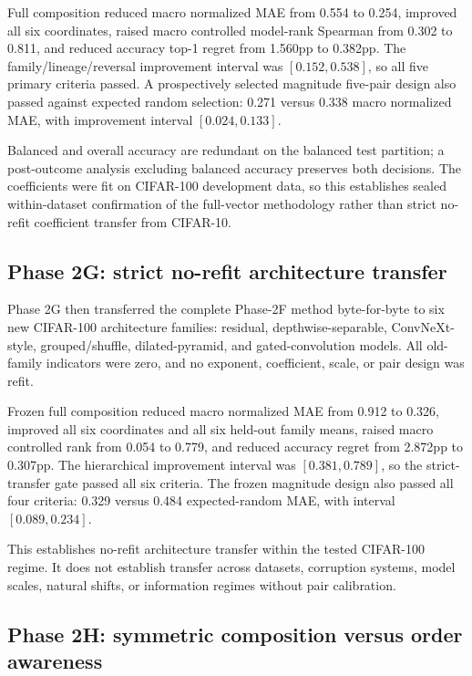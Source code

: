 \documentclass[11pt,a4paper]{article}
\begin{document}
Full composition reduced macro normalized MAE from 0.554 to 0.254, improved
all six coordinates, raised macro controlled model-rank Spearman from 0.302 to
0.811, and reduced accuracy top-1 regret from 1.560pp to 0.382pp.  The
family/lineage/reversal improvement interval was $[0.152,0.538]$, so all five
primary criteria passed.  A prospectively selected magnitude five-pair design
also passed against expected random selection: 0.271 versus 0.338 macro
normalized MAE, with improvement interval $[0.024,0.133]$.

Balanced and overall accuracy are redundant on the balanced test partition;
a post-outcome analysis excluding balanced accuracy preserves both decisions.
The coefficients were fit on CIFAR-100 development data, so this establishes
sealed within-dataset confirmation of the full-vector methodology rather than
strict no-refit coefficient transfer from CIFAR-10.

\subsection{Phase 2G: strict no-refit architecture transfer}

Phase 2G then transferred the complete Phase-2F method byte-for-byte to six
new CIFAR-100 architecture families: residual, depthwise-separable,
ConvNeXt-style, grouped/shuffle, dilated-pyramid, and gated-convolution
models.  All old-family indicators were zero, and no exponent, coefficient,
scale, or pair design was refit.

Frozen full composition reduced macro normalized MAE from 0.912 to 0.326,
improved all six coordinates and all six held-out family means, raised macro
controlled rank from 0.054 to 0.779, and reduced accuracy regret from 2.872pp
to 0.307pp.  The hierarchical improvement interval was
$[0.381,0.789]$, so the strict-transfer gate passed all six criteria.  The
frozen magnitude design also passed all four criteria: 0.329 versus 0.484
expected-random MAE, with interval $[0.089,0.234]$.

This establishes no-refit architecture transfer within the tested CIFAR-100
regime.  It does not establish transfer across datasets, corruption systems,
model scales, natural shifts, or information regimes without pair
calibration.

\subsection{Phase 2H: symmetric composition versus order awareness}
\end{document}
